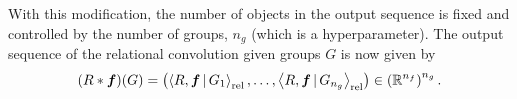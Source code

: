 With this modification, the number of objects in the output sequence is fixed and controlled by the number of groups, $n_g$ (which is a hyperparameter). The output sequence of the relational convolution given groups $G$ is now given by
\begin{equation}\label{eq:soft_relational_convolution_groups}
    (R \ast \bm{f})(G) = \left( \left\langle R, \bm{f} \, \vert \, G_1 \right\rangle_\mathrm{rel}, \ldots, \left\langle R, \bm{f} \, \vert \, G_{n_g} \right\rangle_\mathrm{rel} \right) \in \left(\mathbb{R}^{n_f}\right)^{n_g}.
\end{equation}
